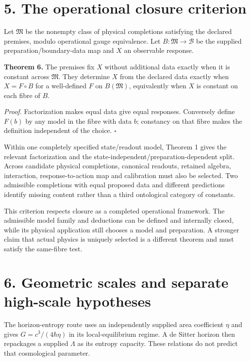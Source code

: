 \documentclass[
  11pt,
  a4paper,
]{article}
\begin{document}
\section{5. The operational closure criterion}\label{the-operational-closure-criterion}

Let \(\mathfrak M\) be the nonempty class of physical completions satisfying the declared premises, modulo operational gauge equivalence. Let \(B:\mathfrak M\to\mathcal B\) be the supplied preparation/boundary-data map and \(X\) an observable response.

\textbf{Theorem 6.} The premises fix \(X\) without additional data exactly when it is constant across \(\mathfrak M\). They determine \(X\) from the declared data exactly when \(X=F\circ B\) for a well-defined \(F\) on \(B(\mathfrak M)\), equivalently when \(X\) is constant on each fibre of \(B\).

\emph{Proof.} Factorization makes equal data give equal responses. Conversely define \(F(b)\) by any model in the fibre with data \(b\); constancy on that fibre makes the definition independent of the choice. \(\square\)

Within one completely specified state/readout model, Theorem 1 gives the relevant factorization and the state-independent/preparation-dependent split. Across candidate physical completions, canonical readouts, retained algebra, interaction, response-to-action map and calibration must also be selected. Two admissible completions with equal proposed data and different predictions identify missing content rather than a third ontological category of constants.

This criterion respects closure as a completed operational framework. The admissible model family and deductions can be defined and internally closed, while its physical application still chooses a model and preparation. A stronger claim that actual physics is uniquely selected is a different theorem and must satisfy the same-fibre test.

\section{6. Geometric scales and separate high-scale hypotheses}\label{geometric-scales-and-separate-high-scale-hypotheses}

The horizon-entropy route uses an independently supplied area coefficient \(\eta\) and gives \(G=c^3/(4\hbar\eta)\) in its local-equilibrium regime. A de Sitter horizon then repackages a supplied \(\Lambda\) as its entropy capacity. These relations do not predict that cosmological parameter.
\end{document}
